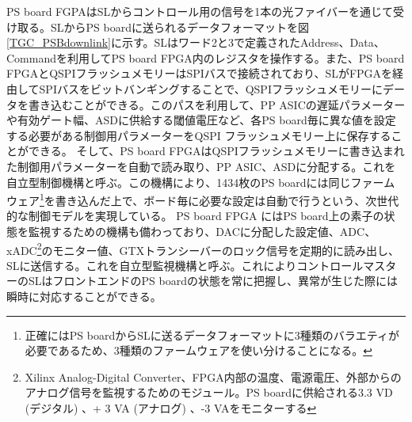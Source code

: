     PS board FGPAはSLからコントロール用の信号を1本の光ファイバーを通じて受け取る。SLからPS boardに送られるデータフォーマットを図\ref{TGC_PSBdownlink}に示す。SLはワード2と3で定義されたAddress、Data、Commandを利用してPS board FPGA内のレジスタを操作する。また、PS board FPGAとQSPIフラッシュメモリーはSPIバスで接続されており、SLがFPGAを経由してSPIバスをビットバンギングすることで、QSPIフラッシュメモリーにデータを書き込むことができる。このパスを利用して、PP ASICの遅延パラメーターや有効ゲート幅、ASDに供給する閾値電圧など、各PS board毎に異な値を設定する必要がある制御用パラメーターをQSPI フラッシュメモリー上に保存することができる。
    そして、PS board FPGAはQSPIフラッシュメモリーに書き込まれた制御用パラメーターを自動で読み取り、PP ASIC、ASDに分配する。これを自立型制御機構と呼ぶ。この機構により、1434枚のPS boardには同じファームウェア\footnote{正確にはPS boardからSLに送るデータフォーマットに3種類のバラエティが必要であるため、3種類のファームウェアを使い分けることになる。}を書き込んだ上で、ボード毎に必要な設定は自動で行うという、次世代的な制御モデルを実現している。
    PS board FPGA にはPS board上の素子の状態を監視するための機構も備わっており、DACに分配した設定値、ADC、xADC\footnote{Xilinx Analog-Digital Converter、FPGA内部の温度、電源電圧、外部からのアナログ信号を監視するためのモジュール。PS boardに供給される3.3 VD  (デジタル) 、+ 3 VA  (アナログ) 、-3 VAをモニターする}のモニター値、GTXトランシーバーのロック信号を定期的に読み出し、SLに送信する。これを自立型監視機構と呼ぶ。これによりコントロールマスターのSLはフロントエンドのPS boardの状態を常に把握し、異常が生じた際には瞬時に対応することができる。

